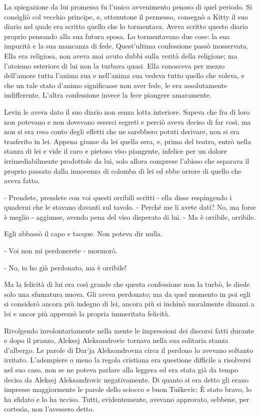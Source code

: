 La spiegazione da lui promessa fu l'unico avvenimento penoso di quel periodo. Si consigliò col vecchio principe, e, ottenutone il permesso, consegnò a Kitty il suo diario nel quale era scritto quello che lo tormentava. Aveva scritto questo diario proprio pensando alla sua futura sposa. Lo tormentavano due cose: la sua impurità e la sua mancanza di fede. Quest'ultima confessione passò inosservata. Ella era religiosa, non aveva mai avuto dubbi sulla verità della religione; ma l'ateismo esteriore di lui non la turbava quasi. Ella conosceva per mezzo dell'amore tutta l'anima sua e nell'anima sua vedeva tutto quello che voleva, e che un tale stato d'animo significasse non aver fede, le era assolutamente indifferente. L'altra confessione invece la fece piangere amaramente. 

Levin le aveva dato il suo diario non senza lotta interiore. Sapeva che fra di loro non potevano e non dovevano esserci segreti e perciò aveva deciso di far così, ma non si era reso conto degli effetti che ne sarebbero potuti derivare, non si era trasferito in lei. Appena giunse da lei quella sera, e, prima del teatro, entrò nella stanza di lei e vide il caro e pietoso viso piangente, infelice per un dolore irrimediabilmente prodottole da lui, solo allora comprese l'abisso che separava il proprio passato dalla innocenza di colomba di lei ed ebbe orrore di quello che aveva fatto. 

- Prendete, prendete con voi questi orribili scritti - ella disse respingendo i quaderni che le stavano davanti sul tavolo. - Perché me li avete dati? No, ma forse è meglio - aggiunse, avendo pena del viso disperato di lui. - Ma è orribile, orribile. 

Egli abbassò il capo e tacque. Non poteva dir nulla. 

- Voi non mi perdonerete - mormorò. 

- No, io ho già perdonato, ma è orribile! 

Ma la felicità di lui era così grande che questa confessione non la turbò, le diede solo una sfumatura nuova. Gli aveva perdonato; ma da quel momento in poi egli si considerò ancora più indegno di lei, ancora più si inchinò moralmente dinanzi a lei e ancor più apprezzò la propria immeritata felicità. 

\label{xvii-3} 

Rivolgendo involontariamente nella mente le impressioni dei discorsi fatti durante e dopo il pranzo, Aleksej Aleksandrovic tornava nella sua solitaria stanza d'albergo. Le parole di Dar'ja Aleksandrovna circa il perdono lo avevano soltanto irritato. L'adempiere o meno la regola cristiana era questione difficile a risolversi nel suo caso, non se ne poteva parlare alla leggera ed era stata già da tempo decisa da Aleksej Aleksandrovic negativamente. Di quanto si era detto gli erano impresse maggiormente le parole dello sciocco e buon Tuškevic: È stato bravo, lo ha sfidato e lo ha ucciso. Tutti, evidentemente, avevano approvato, sebbene, per cortesia, non l'avessero detto. 

